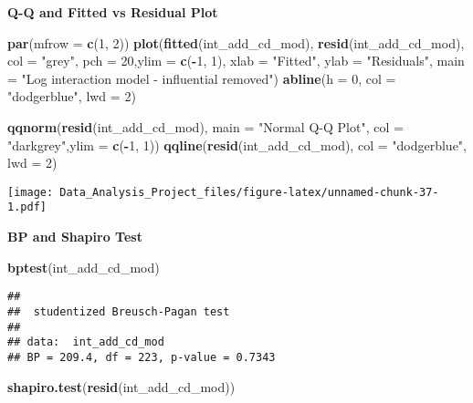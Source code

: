 \documentclass[]{article}
\newenvironment{Shaded}{\begin{snugshade}}{\end{snugshade}}
\newcommand{\KeywordTok}[1]{\textcolor[rgb]{0.13,0.29,0.53}{\textbf{#1}}}
\newcommand{\DataTypeTok}[1]{\textcolor[rgb]{0.13,0.29,0.53}{#1}}
\newcommand{\DecValTok}[1]{\textcolor[rgb]{0.00,0.00,0.81}{#1}}
\newcommand{\StringTok}[1]{\textcolor[rgb]{0.31,0.60,0.02}{#1}}
\newcommand{\OperatorTok}[1]{\textcolor[rgb]{0.81,0.36,0.00}{\textbf{#1}}}
\newcommand{\NormalTok}[1]{#1}
\begin{document}
\textbf{Q-Q and Fitted vs Residual Plot}

\begin{Shaded}
\begin{Highlighting}[]
 \KeywordTok{par}\NormalTok{(}\DataTypeTok{mfrow =} \KeywordTok{c}\NormalTok{(}\DecValTok{1}\NormalTok{, }\DecValTok{2}\NormalTok{))}
\KeywordTok{plot}\NormalTok{(}\KeywordTok{fitted}\NormalTok{(int_add_cd_mod), }\KeywordTok{resid}\NormalTok{(int_add_cd_mod), }\DataTypeTok{col =} \StringTok{"grey"}\NormalTok{, }\DataTypeTok{pch =} \DecValTok{20}\NormalTok{,}\DataTypeTok{ylim =} \KeywordTok{c}\NormalTok{(}\OperatorTok{-}\DecValTok{1}\NormalTok{, }\DecValTok{1}\NormalTok{),}
    \DataTypeTok{xlab =} \StringTok{"Fitted"}\NormalTok{, }\DataTypeTok{ylab =} \StringTok{"Residuals"}\NormalTok{, }\DataTypeTok{main =} \StringTok{"Log interaction model - influential removed"}\NormalTok{)}
\KeywordTok{abline}\NormalTok{(}\DataTypeTok{h =} \DecValTok{0}\NormalTok{, }\DataTypeTok{col =} \StringTok{"dodgerblue"}\NormalTok{, }\DataTypeTok{lwd =} \DecValTok{2}\NormalTok{)}

\KeywordTok{qqnorm}\NormalTok{(}\KeywordTok{resid}\NormalTok{(int_add_cd_mod), }\DataTypeTok{main =} \StringTok{"Normal Q-Q Plot"}\NormalTok{, }\DataTypeTok{col =} \StringTok{"darkgrey"}\NormalTok{,}\DataTypeTok{ylim =} \KeywordTok{c}\NormalTok{(}\OperatorTok{-}\DecValTok{1}\NormalTok{, }\DecValTok{1}\NormalTok{))}
\KeywordTok{qqline}\NormalTok{(}\KeywordTok{resid}\NormalTok{(int_add_cd_mod), }\DataTypeTok{col =} \StringTok{"dodgerblue"}\NormalTok{, }\DataTypeTok{lwd =} \DecValTok{2}\NormalTok{)}
\end{Highlighting}
\end{Shaded}

\texttt{[image: Data\_Analysis\_Project\_files/figure-latex/unnamed-chunk-37-1.pdf]}

\textbf{BP and Shapiro Test }

\begin{Shaded}
\begin{Highlighting}[]
\KeywordTok{bptest}\NormalTok{(int_add_cd_mod)}
\end{Highlighting}
\end{Shaded}

\begin{verbatim}
## 
##  studentized Breusch-Pagan test
## 
## data:  int_add_cd_mod
## BP = 209.4, df = 223, p-value = 0.7343
\end{verbatim}

\begin{Shaded}
\begin{Highlighting}[]
\KeywordTok{shapiro.test}\NormalTok{(}\KeywordTok{resid}\NormalTok{(int_add_cd_mod))}
\end{Highlighting}
\end{Shaded}
\end{document}
